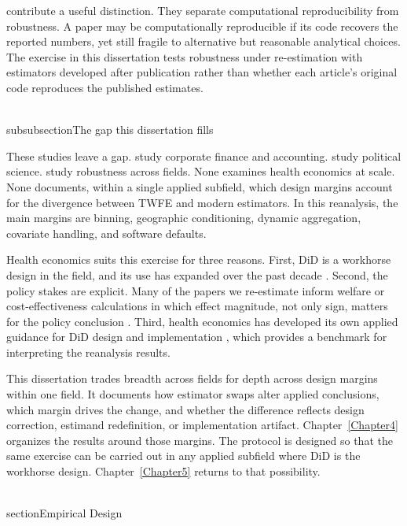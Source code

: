 \documentclass[11pt]{article}
\begin{document}
\textcite{brodeur2026reproducibility} contribute a useful distinction. They separate computational reproducibility from robustness. A paper may be computationally reproducible if its code recovers the reported numbers, yet still fragile to alternative but reasonable analytical choices. The exercise in this dissertation tests robustness under re-estimation with estimators developed after publication rather than whether each article's original code reproduces the published estimates.

\\subsubsection{The gap this dissertation fills}
\label{sec:ch2_gap}

These studies leave a gap. \textcite{baker2022much} study corporate finance and accounting. \textcite{chiu2026causal} study political science. \textcite{brodeur2026reproducibility} study robustness across fields. None examines health economics at scale. None documents, within a single applied subfield, which design margins account for the divergence between TWFE and modern estimators. In this reanalysis, the main margins are binning, geographic conditioning, dynamic aggregation, covariate handling, and software defaults.

Health economics suits this exercise for three reasons. First, DiD is a workhorse design in the field, and its use has expanded over the past decade \parencite{goldsmith2024tracking}. Second, the policy stakes are explicit. Many of the papers we re-estimate inform welfare or cost-effectiveness calculations in which effect magnitude, not only sign, matters for the policy conclusion \parencite{stinnett1998net}. Third, health economics has developed its own applied guidance for DiD design and implementation \parencite{wing2018designing}, which provides a benchmark for interpreting the reanalysis results.

This dissertation trades breadth across fields for depth across design margins within one field. It documents how estimator swaps alter applied conclusions, which margin drives the change, and whether the difference reflects design correction, estimand redefinition, or implementation artifact. Chapter~\ref{Chapter4} organizes the results around those margins. The protocol is designed so that the same exercise can be carried out in any applied subfield where DiD is the workhorse design. Chapter~\ref{Chapter5} returns to that possibility.

\\section{Empirical Design}
\label{Chapter3}
\end{document}
